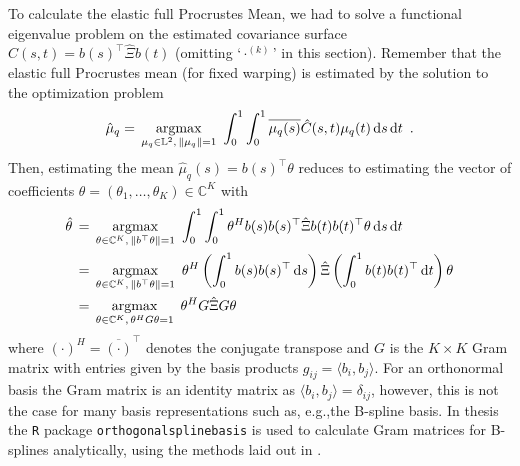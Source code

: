 To calculate the elastic full Procrustes Mean, we had to solve a functional eigenvalue problem on the estimated covariance surface $\hat{C}(s,t) = b(s)^\top \hat\Xi b(t)$ (omitting \enquote*{$\cdot^{(k)}$} in this section).
Remember that the elastic full Procrustes mean (for fixed warping) is estimated by the solution to the optimization problem
\begin{equation}
\hat\mu_q = \, \operatorname*{argmax}_{\mu_q \in \mathbb{L}^2,\,\lVert\mu_q\rVert = 1}\,\,
   \int_0^1 \int_0^1 \overline{\mu_q (s)} \hat C(s,t) \mu_q(t) \mathop{\mathrm{d}s}\mathop{\mathrm{d}t}\,\,.
\end{equation}
Then, estimating the mean $\hat \mu_q (s) = b(s)^\top \theta$ reduces to estimating the vector of coefficients $\theta = (\theta_1, \dots, \theta_K) \in \mathbb{C}^K$ with
\begin{align}
  \hat\theta& \, = \, \operatorname*{argmax}_{\theta \in \mathbb{C}^K,\,\lVert b^\top\theta\rVert = 1}\,\,
    \int_0^1 \int_0^1 \theta^H b(s) b(s)^\top \hat\Xi b(t) b(t)^\top \theta \mathop{\mathrm{d}s}\mathop{\mathrm{d}t} \\
  &\, = \, \operatorname*{argmax}_{\theta \in \mathbb{C}^K,\,\lVert b^\top\theta\rVert = 1}\,\,
    \theta^H \left( \int_0^1 b(s) b(s)^\top \mathop{\mathrm{d}s} \right) \hat\Xi \left( \int_0^1 b(t) b(t)^\top \mathop{\mathrm{d}t}\right) \theta \\
  &\, = \, \operatorname*{argmax}_{\theta \in \mathbb{C}^K,\,\theta^H G \theta = 1}\,\,
    \theta^H G \hat\Xi G \theta \label{eq:3-target}
\end{align}
where $(\cdot)^H = \overline{(\cdot)}^\top$ denotes the conjugate transpose and $G$ is the $K \times K$ Gram matrix with entries given by the basis products $g_{ij} = \langle b_i, b_j \rangle$.
For an orthonormal basis the Gram matrix is an identity matrix as $\langle b_i, b_j \rangle = \delta_{ij}$, however, this is not the case for many basis representations such as, e.g.,the B-spline basis.
In thesis the \texttt{R} package \texttt{orthogonalsplinebasis} \parencite{orthogonalsplinebasis} is used to calculate Gram matrices for B-splines analytically, using the methods laid out in \cite{Redd2012}.


